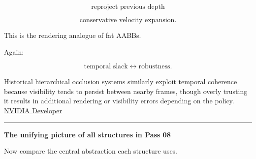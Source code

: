 \[
\text{reproject previous depth}
\]

\[
\text{conservative velocity expansion}.
\]

This is the rendering analogue of fat AABBs.

Again:

\[
\text{temporal slack}
\leftrightarrow
\text{robustness}.
\]

Historical hierarchical occlusion systems similarly exploit temporal coherence because visibility tends to persist between nearby frames, though overly trusting it results in additional rendering or visibility errors depending on the policy. \href{https://developer.nvidia.com/gpugems/gpugems2/part-i-geometric-complexity/chapter-6-hardware-occlusion-queries-made-useful?utm_source=chatgpt.com}{NVIDIA Developer}

\begin{center}\rule{0.5\linewidth}{0.5pt}\end{center}

\textbf{The unifying picture of all structures in Pass 08}

Now compare the central abstraction each structure uses.

